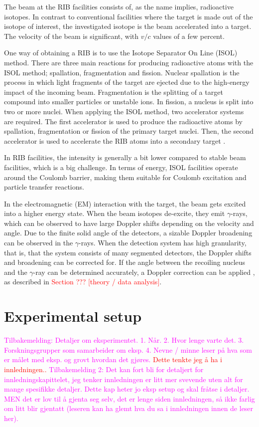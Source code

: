 \documentclass[twoside,english]{uiofysmaster/uiofysmaster}
\newcommand{\ga}{$\gamma$}
\begin{document}
The beam at the RIB facilities consists of, as the name implies, radioactive isotopes. 
In contrast to conventional facilities where the target is made out of the isotope of interest, the investigated isotope is the beam accelerated into a target.
The velocity of the beam is significant, with $v/c$ values of a few percent. 

One way of obtaining a RIB is to use the Isotope Separator On Line (ISOL) method. 
There are three main reactions for producing radioactive atoms with the ISOL method; spallation, fragmentation and fission. 
Nuclear spallation is the process in which light fragments of the target are ejected due to the high-energy impact of the incoming beam. 
Fragmentation is the splitting of a target compound into smaller particles or unstable ions. 
In fission, a nucleus is split into two or more nuclei.
When applying the ISOL method, two accelerator systems are required. 
The first accelerator is used to produce the radioactive atoms by spallation, fragmentation or fission of the primary target nuclei. 
Then, the second accelerator is used to accelerate the RIB atoms into a secondary target \cite{ISOLDE-web, Lindroos, ISOL}. 

In RIB facilities, the intensity is generally a bit lower compared to stable beam facilities, which is a big challenge. 
In terms of energy, ISOL facilities operate around the Coulomb barrier, making them suitable for Coulomb excitation and particle transfer reactions. 

In the electromagnetic (EM) interaction with the target, the beam gets excited into a higher energy state.
When the beam isotopes de-excite, they emit \ga-rays, which can be observed to have large Doppler shifts depending on the velocity and angle.
Due to the finite solid angle of the detectors, a sizable Doppler broadening can be observed in the \ga-rays. 
When the detection system has high granularity, that is, that the system consists of many segmented detectors, the Doppler shifts and broadening can be corrected for. 
If the angle between the recoiling nucleus and the \ga-ray can be determined accurately, a Doppler correction can be applied \cite{MB-spect}, as described in \textcolor{red}{Section ??? [theory / data analysis]}.


\section{Experimental setup}

\textcolor{Magenta}{Tilbakemelding:\newline
Detaljer om eksperimentet. 1. Når. 2. Hvor lenge varte det. 3. Forskningsgrupper som samarbeider om eksp. 4. Nevne / minne leser på hva som er målet med eksp. og grovt hvordan det gjøres.
} 
\textcolor{red}{Dette tenkte jeg å ha i innledningen..}
\textcolor{Magenta}{Tilbakemelding 2:\newline
Det kan fort bli for detaljert for innledningskapittelet, jeg tenker innledningen er litt mer svevende uten alt for mange spesifikke detaljer. Dette kap heter jo eksp setup og skal fråtse i detaljer. MEN det er lov til å gjenta seg selv, det er lenge siden innledningen, så ikke farlig om litt blir gjentatt (leseren kan ha glemt hva du sa i innledningen innen de leser her). 
} 
\end{document}
